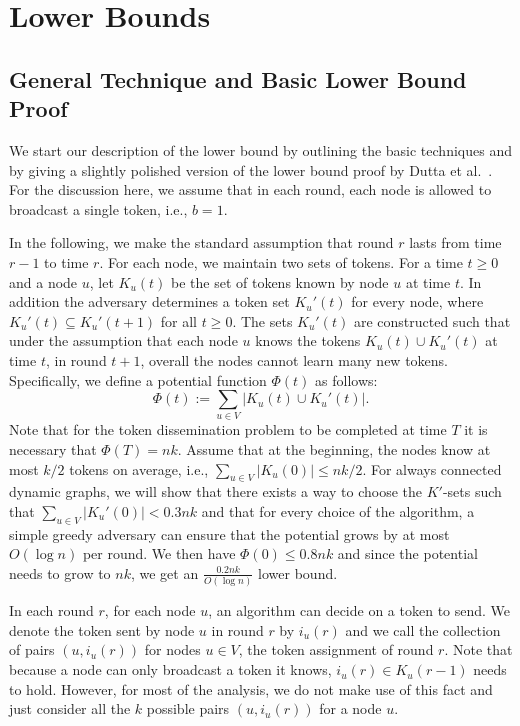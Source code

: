 \documentclass{llncs}
\begin{document}
\section{Lower Bounds}
\label{sec:lowerbounds}

\subsection{General Technique and Basic Lower Bound Proof}
\label{sec:original}

We start our description of the lower bound by outlining the basic
techniques and by giving a slightly polished version of the lower
bound proof by Dutta et al.~\cite{LBarxiv}. For the discussion here,
we assume that in each round, each node is allowed to broadcast a
single token, i.e., $b=1$.

In the following, we make the standard assumption that round $r$ lasts
from time $r-1$ to time $r$. For each node, we maintain two sets of
tokens. For a time $t\geq 0$ and a node $u$, let $K_u(t)$ be the set
of tokens known by node $u$ at time $t$. In addition the adversary
determines a token set $K_u'(t)$ for every node, where
$K_u'(t)\subseteq K_u'(t+1)$ for all $t\geq 0$. The sets $K_u'(t)$ are
constructed such that under the assumption that each node $u$ knows
the tokens $K_u(t)\cup K_u'(t)$ at time $t$, in round $t+1$, overall
the nodes cannot learn many new tokens. Specifically, we define a
potential function $\Phi(t)$ as follows:
\begin{equation}
    \label{eq:potential}
    \Phi(t) := \sum_{u\in V} \left|K_u(t) \cup K_u'(t)\right|.
\end{equation}
Note that for the token dissemination problem to be completed at time
$T$ it is necessary that $\Phi(T) = nk$. Assume that at the beginning,
the nodes know at most $k/2$ tokens on average, i.e., $\sum_{u\in
    V}|K_u(0)|\leq nk/2$. For always connected dynamic graphs, we will
show that there exists a way to choose the $K'$-sets such that
$\sum_{u\in V}|K_u'(0)|<0.3nk$ and that for every choice of the
algorithm, a simple greedy adversary can ensure that the potential
grows by at most $O(\log n)$ per round. We then have $\Phi(0)\leq
0.8nk$ and since the potential needs to grow to $nk$, we get an
$\frac{0.2nk}{O(\log n)}$ lower bound.

In each round $r$, for each node $u$, an algorithm can decide on a
token to send. We denote the token sent by node $u$ in round $r$ by
$i_u(r)$ and we call the collection of pairs $(u,i_u(r))$ for nodes
$u\in V$, the token assignment of round $r$. Note that because a node
can only broadcast a token it knows, $i_u(r)\in K_u(r-1)$ needs to
hold. However, for most of the analysis, we do not make use of
this fact and just consider all the $k$ possible pairs $(u,i_u(r))$
for a node $u$.
\end{document}
